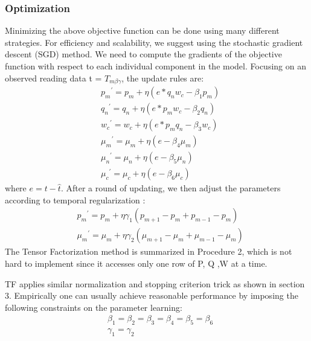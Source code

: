\subsubsection{Optimization}
Minimizing the above objective function can be done using many different strategies.
For efficiency and scalability, we suggest using the stochastic gradient descent (SGD) method.
We need to compute the gradients of the objective function with respect to each individual component in the model.
Focusing on an observed reading data t = $T_{m\beta\gamma } $, the update rules are:
\begin{equation*}
\begin{aligned}
&{p_m}^\prime={p_m}+\eta(e*q_n w_c - \beta_1 p_m)
\\&{q_n}^\prime={q_n}+\eta(e*p_m w_c - \beta_2 q_n)
\\&{w_c}^\prime={w_c}+\eta(e*p_m q_n - \beta_3 w_c)
\\&{\mu_m}^\prime=\mu_m+\eta(e-\beta_4\mu_m)
\\&{\mu_n}^\prime=\mu_n+\eta(e-\beta_5\mu_n)
\\&{\mu_c}^\prime=\mu_c+\eta(e-\beta_6\mu_c)
\end{aligned}
\end{equation*}
where $e=t-\hat{t}$. After a round of updating, we then adjust the parameters according to temporal regularization :
\begin{equation*}
\begin{aligned}
&{p_m}^\prime={p_m}+\eta\gamma_1(p_{m+1}-p_m+p_{m-1}-p_m)
\\&{\mu_m}^\prime=\mu_m+\eta\gamma_2(\mu_{m+1}-\mu_m+\mu_{m-1}-\mu_m)
\end{aligned}
\end{equation*}
The Tensor Factorization method is summarized in Procedure 2, which is not hard to implement since it accesses only one row of P, Q ,W at a time.

TF applies similar normalization and stopping criterion trick as shown in section 3.
Empirically one can usually achieve reasonable performance by imposing the following constraints on the parameter learning:  
\begin{equation*}
\begin{aligned}
& \beta_1=\beta_2=\beta_3=\beta_4=\beta_5=\beta_6\\
&\gamma_1=\gamma_2\\
\end{aligned}
\end{equation*}
